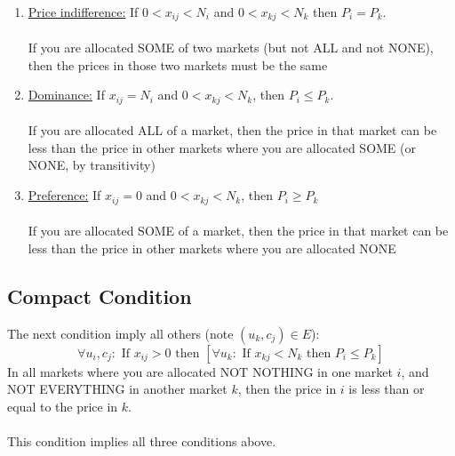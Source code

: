\documentclass[12pt,letterpaper]{article}
\newcommand{\Campaign}{c}
\newcommand{\CampaignIndex}{j}
\newcommand{\User}{u}
\newcommand{\UserIndex}{i}
\newcommand{\NumberOfUsers}{N}
\newcommand{\Edges}{E}
\newcommand{\Price}{P}
\newcommand{\AllocationMatrixEntry}{x}
\begin{document}
\begin{enumerate}
	\item \underline{Price indifference:} 
	If $0<\AllocationMatrixEntry_{ij}<\NumberOfUsers_\UserIndex$ and $0<\AllocationMatrixEntry_{kj}<\NumberOfUsers_k$ then $\Price_\UserIndex = \Price_k$. \\\\
	If you are allocated SOME of two markets (but not ALL and not NONE), then the prices in those two markets must be the same	
	
	\item \underline{Dominance:} 
	If $\AllocationMatrixEntry_{ij} = \NumberOfUsers_\UserIndex$ and $0<\AllocationMatrixEntry_{kj}<\NumberOfUsers_{k}$, then $\Price_{i} \le \Price_{k}.$ \\\\
	If you are allocated ALL of a market, then the price in that market can be less than the price in other markets where you are allocated SOME (or NONE, by transitivity)
	
	\item \underline{Preference:} 
	If $\AllocationMatrixEntry_{\UserIndex\CampaignIndex}=0$ and $0<\AllocationMatrixEntry_{k\CampaignIndex} <\NumberOfUsers_{k}$, then $\Price_{i}\ge \Price_{k}$\\\\
	If you are allocated SOME of a market, then the price in that market can be less than the price in other markets where you are allocated NONE
\end{enumerate}


\subsection*{Compact Condition}

The next condition imply all others (note $(\User_k, \Campaign_\CampaignIndex) \in \Edges$):
    $$\forall \User_\UserIndex,\Campaign_\CampaignIndex: \text{ If } \AllocationMatrixEntry_{\UserIndex\CampaignIndex}>0 \text{ then }\left[ \forall \User_k: \text{ If }
    		\AllocationMatrixEntry_{kj} <\NumberOfUsers_{k}   \text{ then } \Price_{i} \le\Price_{k}\right]$$
 In all markets where you are allocated NOT NOTHING in one market $i$, and NOT EVERYTHING in another market $k$, then
the price in $i$ is less than or equal to the price in $k$. \\\\

This condition implies all three conditions above.\\
\end{document}
